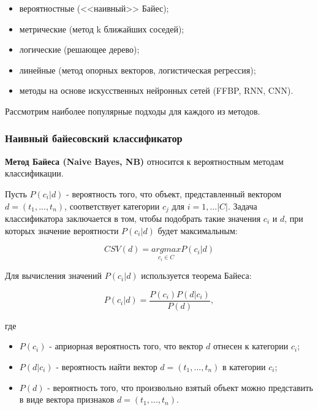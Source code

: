 \documentclass[utf8x, 14pt, oneside, a4paper]{article}
\begin{document}
	\begin{itemize}
		\item вероятностные (<<наивный>> Байес);
		\item метрические (метод k ближайших соседей);
		\item логические (решающее дерево);
		\item линейные (метод опорных векторов, логистическая регрессия);
		\item методы на основе искусственных нейронных сетей (FFBP, RNN, CNN).
	\end{itemize}
	
	Рассмотрим наиболее популярные подходы для каждого из методов.
	
	\subsubsection{Наивный байесовский классификатор}
	
	{\bf Метод Байеса (Naive Bayes, NB)} относится к вероятностным методам классификации.
	
	Пусть $P(c_i|d)$ - вероятность того, что объект, представленный вектором $d = (t_1, ..., t_n)$, соответствует категории $c_j$ для $i = 1, ...|C|$. Задача классификатора заключается в том, чтобы подобрать такие значения $c_i$ и $d$, при которых значение вероятности $P(c_i|d)$ будет максимальным:
	
	\begin{equation}
		CSV(d) = \underset{c_i\in C}{argmax} P(c_i|d)
	\end{equation}

	Для вычисления значений $P(c_i|d)$ используется теорема Байеса:
	
	\begin{equation}
		P(c_i|d) = \frac{P(c_i) P(d|c_i)}{P(d)},
	\end{equation}\label{eq:bayes}

	где
	
	\begin{itemize}
		\item $P(c_i)$ - априорная вероятность того, что вектор $d$ отнесен к категории $c_i$;
		\item $P(d|c_i)$ - вероятность найти вектор $d = (t_1, ..., t_n)$ в категории $c_i$;
		\item $P(d)$ - вероятность того, что произвольно взятый объект можно представить в виде вектора признаков $d = (t_1, ..., t_n)$.
	\end{itemize}
\end{document}
